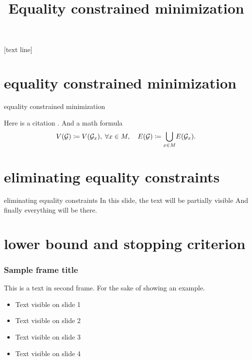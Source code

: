 \documentclass[9pt,aspectratio=54]{beamer}
\title{Equality constrained minimization}
\author[Zuogong Yue, ISB102, LCSB]{}
\date{}
\begin{document}
{
  [text line]{\hfill\parbox[b][40pt][t]%
    {\textwidth}{\sffamily\footnotesize\insertshortauthor}\hfill}
  \begin{frame}
    \titlepage
    \vspace*{-50pt}
    \tableofcontents
  \end{frame}
}
\addtocounter{framenumber}{-1}

\section{equality constrained minimization}
\begin{frame}{equality constrained minimization}

  Here is a citation \cite{Goncalves2009}. And a math formula
  \begin{equation*}
    V(\mathcal{G}) \coloneqq V(\mathcal{G}_x), \;\forall x \in M,
    \quad
    E(\mathcal{G}) \coloneqq \underset{
      \begin{subarray}{c}
        x \in M
      \end{subarray}
    }{\bigcup}E(\mathcal{G}_x).
  \end{equation*}
\end{frame}


\section{eliminating equality constraints}

\begin{frame}{eliminating equality constraints}
  In this slide, the text will be partially visible And finally everything will
  be there.
\end{frame}


\section{lower bound and stopping criterion}

\begin{frame}
  \frametitle{Sample frame title}
  This is a text in second frame.
  For the sake of showing an example.

  \begin{itemize}
  \item  Text visible on slide 1
  \item  Text visible on slide 2
  \item  Text visible on slide 3
  \item  Text visible on slide 4
  \end{itemize}
\end{frame}
\end{document}

